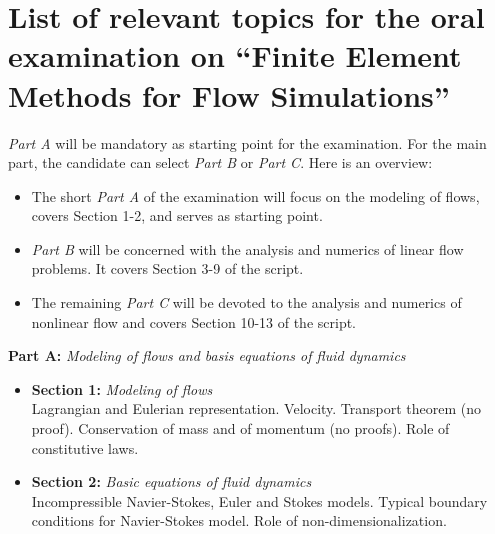 \documentclass[a4paper,10pt]{article}
\begin{document}
\section*{\centering List of relevant topics for the oral examination on ``Finite Element Methods for Flow Simulations''}

\textit{Part A} will be mandatory as starting point for the
examination. For the main part, the candidate can select \textit{Part B} or \textit{Part C}. Here is an overview:
\begin{itemize}
\item The short \textit{Part A} of the examination will focus on the modeling of flows, covers Section 1-2, and serves
as starting point.
\item \textit{Part B} will be concerned with the analysis and numerics of linear flow problems. It covers
Section 3-9 of the script.
\item The remaining \textit{Part C} will be devoted to the analysis and numerics of nonlinear flow and covers
Section 10-13 of the script.
\end{itemize}

\textbf{Part A:} \textit{Modeling of flows and basis equations of fluid dynamics}
\begin{itemize}
\item \textbf{Section 1:} \textit{Modeling of flows}\\
Lagrangian and Eulerian representation. Velocity. Transport theorem (no proof). Conservation of
mass and of momentum (no proofs). Role of constitutive laws.
\item \textbf{Section 2:} \textit{Basic equations of fluid dynamics}\\
Incompressible Navier-Stokes, Euler and Stokes models. Typical boundary conditions for Navier-Stokes model. 
Role of non-dimensionalization.
\end{itemize}
\end{document}
